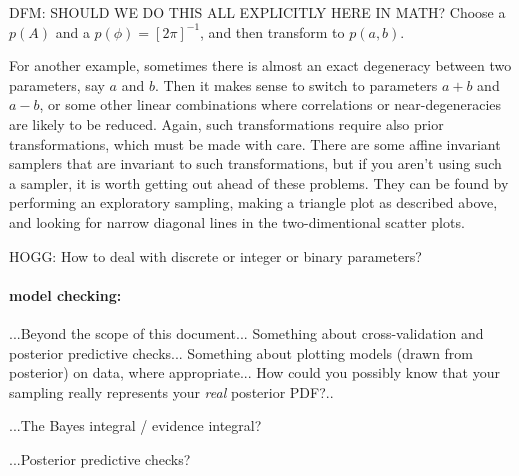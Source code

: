 \documentclass[12pt,twoside,pdftex]{article}
\begin{document}
DFM: SHOULD WE DO THIS ALL EXPLICITLY HERE IN MATH?
Choose a $p(A)$ and a $p(\phi) = [2\pi]^{-1}$,
   and then transform to $p(a, b)$.


For another example, sometimes there is almost an exact degeneracy between two parameters,
  say $a$ and $b$.  Then it makes sense to switch to parameters $a+b$ and $a-b$,
  or some other linear combinations where correlations or near-degeneracies are likely to be reduced.
Again, such transformations require also prior transformations, which must be made with care.
There are some affine invariant samplers that are invariant to such transformations,
  but if you aren't using such a sampler,
  it is worth getting out ahead of these problems.
They can be found by performing an exploratory sampling,
  making a triangle plot as described above,
  and looking for narrow diagonal lines in the two-dimentional scatter plots.

HOGG:  How to deal with discrete or integer or binary parameters?

\paragraph{model checking:}
...Beyond the scope of this document...
Something about cross-validation and posterior predictive checks...
Something about plotting models (drawn from posterior) on data, where appropriate...
How could you possibly know that your sampling really represents your \emph{real} posterior PDF?..

...The Bayes integral / evidence integral?

...Posterior predictive checks?


\end{document}
